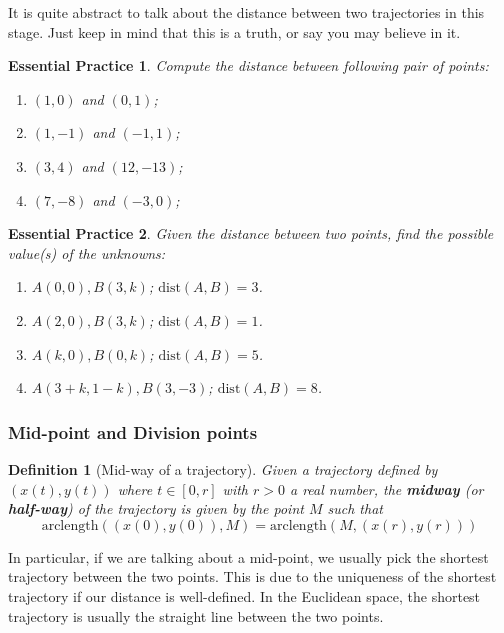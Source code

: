 \documentclass[12pt]{article}
\newtheorem{definition}{Definition}[section]
\newtheorem{exercise}{Essential Practice}[subsection]
\begin{document}
    It is quite abstract to talk about the distance between two trajectories in this stage. Just keep in mind that this is a truth, or say you may believe in it.

    \begin{exercise}
        Compute the distance between following pair of points:\begin{enumerate}
            \item $(1,0)$ and $(0,1)$;
            \item $(1,-1)$ and $(-1,1)$;
            \item $(3,4)$ and $(12,-13)$;
            \item $(7,-8)$ and $(-3,0)$;
        \end{enumerate}
    \end{exercise}

    \begin{exercise}
        Given the distance between two points, find the possible value(s) of the unknowns:\begin{enumerate}
            \item $A(0,0), B(3,k)$; $\mathrm{dist}(A,B)=3$.
            \item $A(2,0), B(3,k)$; $\mathrm{dist}(A,B)=1$.
            \item $A(k,0), B(0,k)$; $\mathrm{dist}(A,B)=5$.
            \item $A(3+k,1-k), B(3,-3)$; $\mathrm{dist}(A,B)=8$.
        \end{enumerate}
    \end{exercise}

    \subsubsection*{Mid-point and Division points}

    \begin{definition}[Mid-way of a trajectory]
        Given a trajectory defined by $(x(t),y(t))$ where $t\in [0,r]$ with $r>0$ a real number, the \textbf{midway} (or \textbf{half-way}) of the trajectory is given by the point $M$ such that $$\mathrm{arclength}((x(0),y(0)),M)=\mathrm{arclength}(M,(x(r),y(r)))$$
    \end{definition}

    In particular, if we are talking about a mid-point, we usually pick the shortest trajectory between the two points. This is due to the uniqueness of the shortest trajectory if our distance is well-defined. In the Euclidean space, the shortest trajectory is usually the straight line between the two points.
\end{document}
